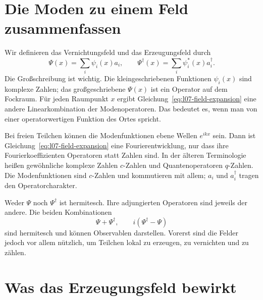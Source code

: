 \section{Die Moden zu einem Feld zusammenfassen}

Wir definieren das Vernichtungsfeld und das Erzeugungsfeld durch
\begin{equation}
\Psi(x)=\sum_i \psi_i(x)a_i,
\qquad
\Psi^\dagger(x)=\sum_i \psi_i^*(x)a_i^\dagger.
\label{eq:l07-field-expansion}
\end{equation}
Die Großschreibung ist wichtig. Die kleingeschriebenen Funktionen \(\psi_i(x)\) sind komplexe Zahlen; das großgeschriebene \(\Psi(x)\) ist ein Operator auf dem Fockraum. Für jeden Raumpunkt \(x\) ergibt Gleichung~\eqref{eq:l07-field-expansion} eine andere Linearkombination der Modenoperatoren. Das bedeutet es, wenn man von einer operatorwertigen Funktion des Ortes spricht.

Bei freien Teilchen können die Modenfunktionen ebene Wellen \(e^{ikx}\) sein. Dann ist Gleichung~\eqref{eq:l07-field-expansion} eine Fourierentwicklung, nur dass ihre Fourierkoeffizienten Operatoren statt Zahlen sind. In der älteren Terminologie heißen gewöhnliche komplexe Zahlen \(c\)-Zahlen und Quantenoperatoren \(q\)-Zahlen. Die Modenfunktionen sind \(c\)-Zahlen und kommutieren mit allem; \(a_i\) und \(a_i^\dagger\) tragen den Operatorcharakter.

Weder \(\Psi\) noch \(\Psi^\dagger\) ist hermitesch. Ihre adjungierten Operatoren sind jeweils der andere. Die beiden Kombinationen
\begin{equation}
\Psi+\Psi^\dagger,
\qquad
i(\Psi^\dagger-\Psi)
\label{eq:l07-hermitian-combinations}
\end{equation}
sind hermitesch und können Observablen darstellen. Vorerst sind die Felder jedoch vor allem nützlich, um Teilchen lokal zu erzeugen, zu vernichten und zu zählen.

\begin{classroomqa}
\end{classroomqa}

\section{Was das Erzeugungsfeld bewirkt}

